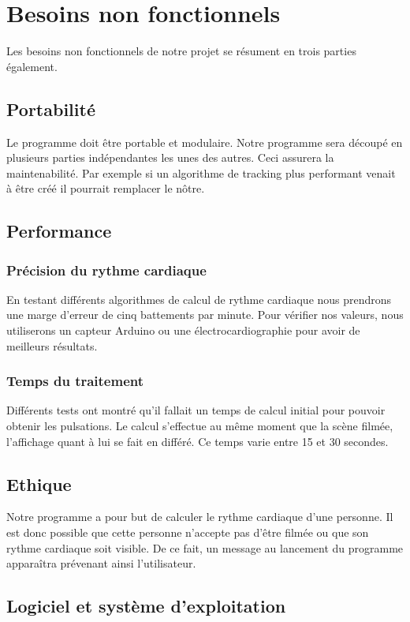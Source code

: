 \documentclass[12pt,a4paper]{article}
\begin{document}
\section{Besoins non fonctionnels}

Les besoins non fonctionnels de notre projet se résument en trois parties également.
\subsection{Portabilité}
Le programme doit être portable et modulaire. Notre programme sera découpé en plusieurs parties indépendantes les unes des autres. Ceci assurera la maintenabilité. Par exemple si un algorithme de tracking plus performant venait à être créé il pourrait remplacer le nôtre.

\subsection{Performance}

\subsubsection{Précision du rythme cardiaque}

En testant différents algorithmes de calcul de rythme cardiaque nous prendrons une marge d'erreur de cinq battements par minute. Pour vérifier nos valeurs, nous utiliserons un capteur Arduino ou une électrocardiographie pour avoir de meilleurs résultats.
\subsubsection{Temps du traitement}

Différents tests ont montré qu'il fallait un temps de calcul initial pour pouvoir obtenir les pulsations. Le calcul s'effectue au même moment que la scène filmée, l'affichage quant à lui se fait en différé. Ce temps varie entre 15 et 30 secondes.

\subsection{Ethique}

Notre programme a pour but de calculer le rythme cardiaque d'une personne. Il est donc possible que cette personne n'accepte pas d'être filmée ou que son rythme cardiaque soit visible. De ce fait, un message au lancement du programme apparaîtra prévenant ainsi l'utilisateur.
\newpage
\subsection{Logiciel et système d'exploitation}
\end{document}
